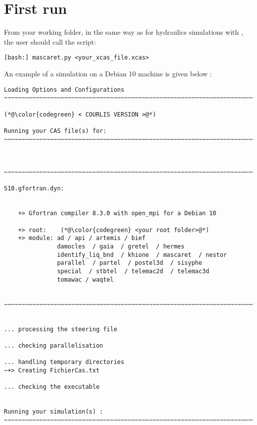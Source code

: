 \section{First run}

From your working folder, in the same way as for hydraulics simulations with \mascaret, the user should call the \mascaret script:
\lstset{language=bash,
        basicstyle=\scriptsize\ttfamily}

\begin{lstlisting}[escapechar=|]
[bash:] mascaret.py <your_xcas_file.xcas>
\end{lstlisting}

An example of a \Cbedload simulation on a Debian 10 machine is given below :
\lstset{language=TelemacCas}
\begin{lstlisting}
Loading Options and Configurations
~~~~~~~~~~~~~~~~~~~~~~~~~~~~~~~~~~~~~~~~~~~~~~~~~~~~~~~~~~~~~~~~~~~~~~~~

(*@\color{codegreen} < COURLIS VERSION >@*)

Running your CAS file(s) for:
~~~~~~~~~~~~~~~~~~~~~~~~~~~~~~~~~~~~~~~~~~~~~~~~~~~~~~~~~~~~~~~~~~~~~~~~



~~~~~~~~~~~~~~~~~~~~~~~~~~~~~~~~~~~~~~~~~~~~~~~~~~~~~~~~~~~~~~~~~~~~~~~~

S10.gfortran.dyn: 
    

    +> Gfortran compiler 8.3.0 with open_mpi for a Debian 10

    +> root:    (*@\color{codegreen} <your root folder>@*)
    +> module: ad / api / artemis / bief
               damocles  / gaia  / gretel  / hermes
               identify_liq_bnd  / khione  / mascaret  / nestor
               parallel  / partel  / postel3d  / sisyphe
               special  / stbtel  / telemac2d  / telemac3d
               tomawac / waqtel


~~~~~~~~~~~~~~~~~~~~~~~~~~~~~~~~~~~~~~~~~~~~~~~~~~~~~~~~~~~~~~~~~~~~~~~~


... processing the steering file

... checking parallelisation

... handling temporary directories
~+> Creating FichierCas.txt
                                                                               
... checking the executable


Running your simulation(s) :
~~~~~~~~~~~~~~~~~~~~~~~~~~~~~~~~~~~~~~~~~~~~~~~~~~~~~~~~~~~~~~~~~~~~~~~~




\end{lstlisting}
